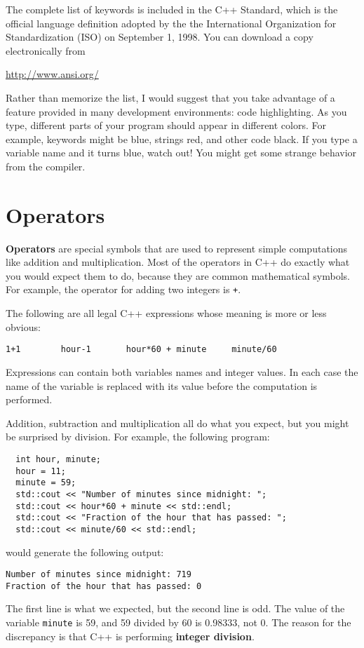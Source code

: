 The complete list of keywords is included in the C++ Standard, which
is the official language definition adopted by the the International
Organization for Standardization (ISO) on September 1, 1998.  You
can download a copy electronically from

    \url{http://www.ansi.org/}

%
Rather than memorize the list, I would suggest that you
take advantage of a feature provided in many development
environments: code highlighting.  As you type, different
parts of your program should appear in different colors.  For
example, keywords might be blue, strings red, and other code
black.  If you type a variable name and it turns blue, watch
out!  You might get some strange behavior from the compiler.

\section{Operators}

{\bf Operators} are special symbols that are used to represent
simple computations like addition and multiplication.  Most
of the operators in C++ do exactly what you would expect them
to do, because they are common mathematical symbols.  For
example, the operator for adding two integers is {\tt +}.

The following are all legal C++ expressions whose meaning is
more or less obvious:

\begin{verbatim}
1+1        hour-1       hour*60 + minute     minute/60
\end{verbatim}
%
Expressions can contain both variables
names and integer values.  In each case the name of the variable is
replaced with its value before the computation is performed.


Addition, subtraction and multiplication all do what you
expect, but you might be surprised by division.  For example,
the following program:

\begin{verbatim}
  int hour, minute;
  hour = 11;
  minute = 59;
  std::cout << "Number of minutes since midnight: ";
  std::cout << hour*60 + minute << std::endl;
  std::cout << "Fraction of the hour that has passed: ";
  std::cout << minute/60 << std::endl;
\end{verbatim}
%
would generate the following output:

\begin{verbatim}
Number of minutes since midnight: 719
Fraction of the hour that has passed: 0
\end{verbatim}
%
The first line is what we expected, but the second line is
odd.  The value of the variable {\tt minute} is 59, and
59 divided by 60 is 0.98333, not 0.  The reason for the
discrepancy is that C++ is performing {\bf integer division}.

